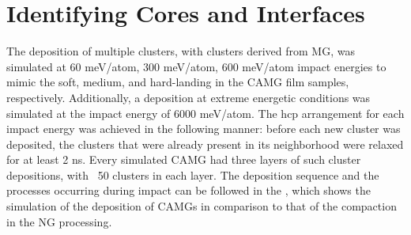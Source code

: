 \section{Identifying Cores and Interfaces}

\begin{selfcite}
The deposition of multiple clusters, with clusters derived from  \cz MG, was simulated at 60 meV/atom, 300 meV/atom, 600 meV/atom impact energies to mimic the soft, medium, and hard-landing in the CAMG film samples, respectively. Additionally, a deposition at extreme energetic conditions was simulated at the impact energy of 6000 meV/atom. The \gls{hcp} arrangement for each impact energy was achieved in the following manner: before each new cluster was deposited, the clusters that were already present in its neighborhood were relaxed for at least 2 ns. Every simulated CAMG had three layers of such cluster depositions, with ~50 clusters in each layer. The deposition sequence and the processes occurring during impact can be followed in the , which shows the simulation of the deposition of CAMGs in comparison to that of the compaction in the NG processing. \par


\end{selfcite}
